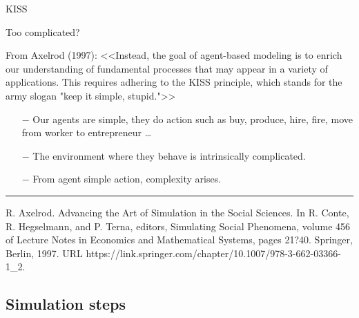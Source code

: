 \documentclass[9pt]{beamer}
\begin{document}
\begin{frame}{KISS}

Too complicated?

\bigskip
\small
From Axelrod (1997): <<Instead, the goal of agent-based modeling is to enrich our understanding of fundamental processes that may appear in a variety of applications. This requires adhering to the KISS principle, which stands for the army slogan "keep it simple, stupid.">>

\bigskip

\normalsize

\begin{itemize}

\item[$-$] Our agents are simple, they do action such as buy, produce, hire, fire, move from worker to entrepreneur \ldots

\item[$-$] The environment where they behave is intrinsically complicated.

\item[$-$] From agent simple action, complexity arises.

\end{itemize}

\bigskip
\bigskip

\scriptsize
\noindent\rule{8cm}{0.4pt}

R. Axelrod. Advancing the Art of Simulation in the Social Sciences. In R. Conte, R. Hegselmann, and P. Terna, editors, Simulating Social Phenomena, volume 456 of Lecture Notes in Economics and Mathematical Systems, pages 21?40. Springer, Berlin, 1997. URL https://link.springer.com/chapter/10.1007/978-3-662-03366-1\_2.

\end{frame}

\subsection{Simulation steps}
\end{document}

